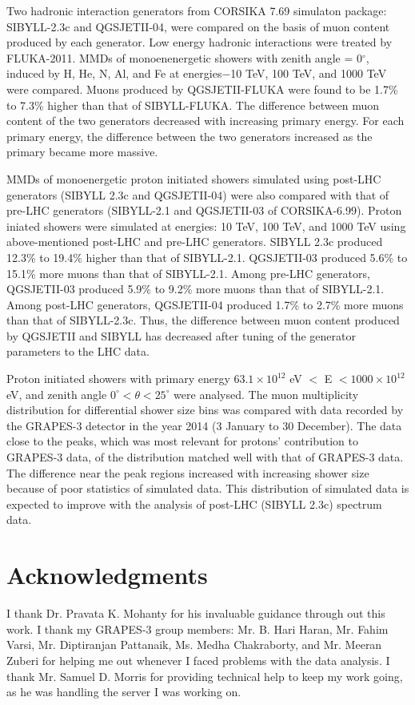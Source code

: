 \documentclass[12pt]{article}
\begin{document}
Two hadronic interaction generators from CORSIKA 7.69 simulaton package: SIBYLL-2.3c and QGSJETII-04, were compared on the basis of muon content produced by each generator. Low energy hadronic interactions were treated by FLUKA-2011. MMDs of monoenenergetic showers with zenith angle = 0$^\circ$, induced by H, He, N, Al, and Fe at energies$-$10 TeV, 100 TeV, and 1000 TeV were compared. Muons produced by QGSJETII-FLUKA were found to be 1.7\% to 7.3\% higher than  that of SIBYLL-FLUKA. The difference between muon content of the two generators decreased with increasing primary energy. For each primary energy, the difference between the two generators increased as the primary became more massive.

MMDs of monoenergetic proton initiated showers simulated using post-LHC generators (SIBYLL 2.3c and QGSJETII-04) were  also compared with that of pre-LHC generators (SIBYLL-2.1 and QGSJETII-03 of CORSIKA-6.99). Proton iniated showers were simulated at energies: 10 TeV, 100 TeV, and 1000 TeV using above-mentioned post-LHC and pre-LHC generators. SIBYLL 2.3c produced 12.3\% to 19.4\% higher than that of SIBYLL-2.1. QGSJETII-03 produced 5.6\% to 15.1\% more muons than that of SIBYLL-2.1. Among pre-LHC generators, QGSJETII-03 produced 5.9\% to 9.2\% more muons than that of SIBYLL-2.1. Among post-LHC generators, QGSJETII-04 produced 1.7\% to 2.7\% more muons than that of SIBYLL-2.3c. Thus, the difference between muon content produced by QGSJETII and SIBYLL has decreased after tuning of the generator parameters to the LHC data.

Proton initiated showers with primary energy $63.1\times10^{12}$ eV $ < $ E $<1000\times10^{12}$ eV, and zenith angle $0^\circ<\theta<25^\circ$ were analysed. The muon multiplicity distribution for differential shower size bins was compared with data recorded by the GRAPES-3 detector in the year 2014 (3 January to 30 December). The data close to the peaks, which was most relevant for protons' contribution to GRAPES-3 data, of the distribution matched well with that of GRAPES-3 data. The difference near the peak regions increased with increasing shower size because of poor statistics of simulated data. This distribution of simulated data is expected to improve with the analysis of post-LHC (SIBYLL 2.3c) spectrum data. 

\section{Acknowledgments}
I thank Dr. Pravata K. Mohanty for his invaluable guidance through out this work. I thank my GRAPES-3 group members: Mr. B. Hari Haran, Mr. Fahim Varsi, Mr. Diptiranjan Pattanaik, Ms. Medha Chakraborty, and Mr. Meeran Zuberi for helping me out whenever I faced problems with the data analysis. I thank Mr. Samuel D. Morris for providing technical help to keep my work going, as he was handling the server I was working on.  
\end{document}
